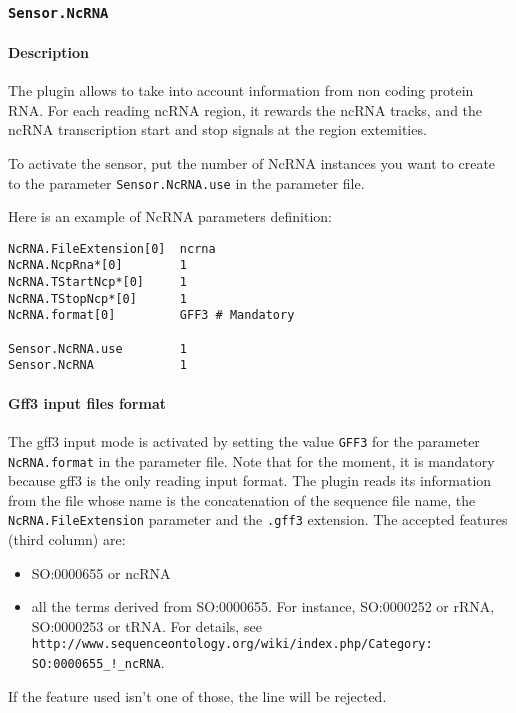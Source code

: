 
\subsubsection{\texttt{Sensor.NcRNA}}
\label{ncrna}
\paragraph{Description}

The plugin allows to take into account information from non coding protein RNA. 
For each reading ncRNA region, it rewards the ncRNA tracks, and the ncRNA transcription start and stop signals at the region extemities.

To activate the sensor, put the number of NcRNA instances you want to create to the parameter
\texttt{Sensor.NcRNA.use} in the parameter file.

Here is an example of NcRNA parameters definition:
\begin{Verbatim}[fontsize=\small]
NcRNA.FileExtension[0]  ncrna
NcRNA.NcpRna*[0]        1 
NcRNA.TStartNcp*[0]     1
NcRNA.TStopNcp*[0]      1	
NcRNA.format[0]         GFF3 # Mandatory

Sensor.NcRNA.use        1
Sensor.NcRNA            1
\end{Verbatim}


\paragraph{Gff3 input files format}

The gff3 input mode is activated by setting the value \texttt{GFF3}
for the parameter \texttt{NcRNA.format} in the parameter file.
Note that for the moment, it is mandatory because gff3 is the only reading input format.
The plugin reads its information from the file whose name is the concatenation
of the sequence file name, the \texttt{NcRNA.FileExtension} parameter 
and the \texttt{.gff3} extension.
The accepted features (third column) are:
\begin{itemize}
 \item SO:0000655 or ncRNA
 \item all the terms derived from SO:0000655. For instance, SO:0000252 or rRNA, SO:0000253 or tRNA. 
For details, see  \texttt{http://www.sequenceontology.org/wiki/index.php/Category:} \texttt{SO:0000655\_!\_ncRNA}.
\end{itemize}

If the feature used isn't one of those, the line will be rejected.


